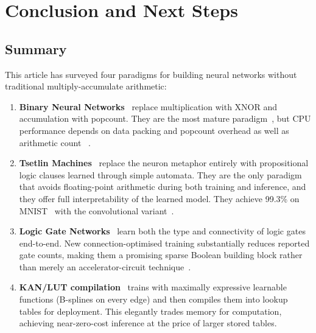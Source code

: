 \section{Conclusion and Next Steps}
\label{sec:conclusion}

\subsection{Summary}

This article has surveyed four paradigms for building neural networks
without traditional multiply-accumulate arithmetic:

\begin{enumerate}[leftmargin=2em]
  \item \textbf{Binary Neural Networks}~\cite{courbariaux2016bnn, rastegari2016xnornet} replace multiplication with
    XNOR and accumulation with popcount. They are the most mature
    paradigm~\cite{bnnsurvey2020}, but CPU performance depends on data
    packing and popcount overhead as well as arithmetic count
    ~\cite{fischer2025popcount}.

  \item \textbf{Tsetlin Machines}~\cite{granmo2018tsetlin} replace the neuron metaphor entirely
    with propositional logic clauses learned through simple automata.
    They are the only paradigm that avoids floating-point arithmetic
    during both training and inference, and they offer full
    interpretability of the learned model. They achieve 99.3\% on
    MNIST~\cite{lecun1998mnist} with the convolutional
    variant~\cite{granmo2019convtm}.

  \item \textbf{Logic Gate Networks}~\cite{petersen2022difflogic} learn both the type and
    connectivity of logic gates end-to-end. New connection-optimised
    training substantially reduces reported gate counts, making them a
    promising sparse Boolean building block rather than merely an
    accelerator-circuit technique~\cite{mommen2026fullytrainable}.

  \item \textbf{KAN/LUT compilation}~\cite{liu2024kan, lutkan2025} trains with maximally expressive
    learnable functions (B-splines on every edge) and then compiles
    them into lookup tables for deployment. This elegantly trades
    memory for computation, achieving near-zero-cost inference at
    the price of larger stored tables.
\end{enumerate}

